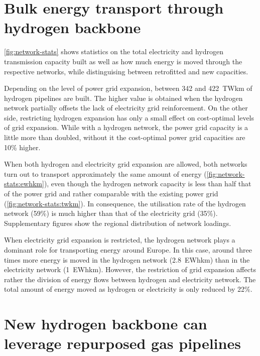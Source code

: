 \section*{Bulk energy transport through hydrogen backbone}
\label{sec:energy-moved}

\cref{fig:network-stats} shows statistics on the total electricity and
hydrogen transmission capacity built as well as how much energy is moved through
the respective networks, while distinguising between retrofitted and new
capacities.


Depending on the level of power grid expansion, between 342 and 422~TWkm of
hydrogen pipelines are built. The higher value is obtained when the hydrogen
network partially offsets the lack of electricity grid reinforcement. On the
other side, restricting hydrogen expansion has only a small effect on
cost-optimal levels of grid expansion. While with a hydrogen network, the power
grid capacity is a little more than doubled, without it the cost-optimal power
grid capacities are 10\% higher.


When both hydrogen and electricity grid expansion are allowed, both networks
turn out to transport approximately the same amount of energy
(\cref{fig:network-stats:ewhkm}), even though the hydrogen network capacity is
less than half that of the power grid and rather comparable with the existing
power grid (\cref{fig:network-stats:twkm}). In consequence, the utilisation rate
of the hydrogen network (59\%) is much higher than that of the electricity grid
(35\%). Supplementary figures show the regional distribution of network
loadings. 

When electricity grid expansion is restricted, the hydrogen network plays a
dominant role for transporting energy around Europe. In this case, around three
times more energy is moved in the hydrogen network (2.8~EWhkm) than in the
electricity network (1~EWhkm). However, the restriction of grid expansion
affects rather the division of energy flows between hydrogen and electricity
network. The total amount of energy moved as hydrogen or electricity is only
reduced by 22\%.

\section*{New hydrogen backbone can leverage repurposed gas pipelines}
\label{sec:repurposed}

